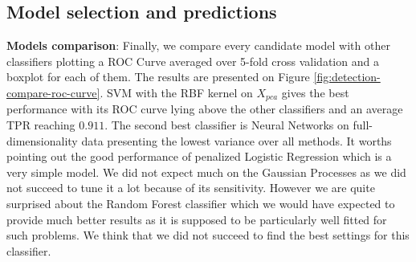 \documentclass[10pt,a4paper]{article}
\begin{document}
  \subsection{Model selection and predictions}
    \textbf{Models comparison}:  Finally, we compare every candidate model with other classifiers plotting a ROC Curve averaged over 5-fold cross validation and a boxplot for each of them. The results are presented on Figure \ref{fig:detection-compare-roc-curve}. SVM with the RBF kernel on $X_{pca}$ gives the best performance with its ROC curve lying above the other classifiers and an average TPR reaching $0.911$. The second best classifier is Neural Networks on full-dimensionality data presenting the lowest variance over all methods. It worths pointing out the good performance of penalized Logistic Regression which is a very simple model. We did not expect much on the Gaussian Processes as we did not succeed to tune it a lot because of its sensitivity. However we are quite surprised about the Random Forest classifier which we would have expected to provide much better results as it is supposed to be particularly well fitted for such problems. We think that we did not succeed to find the best settings for this classifier.
\end{document}

